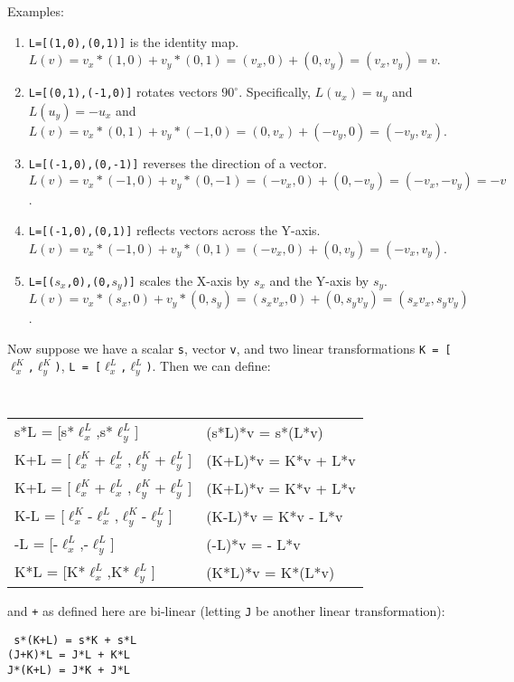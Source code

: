 \documentclass[12pt]{article}
\begin{document}
Examples:
\begin{enumerate}
\item {\tt L=[(1,0),(0,1)]} is the identity map.
$L(v)=v_x*(1,0) + v_y*(0,1) = (v_x,0)+(0,v_y) = (v_x,v_y) = v$.
\item {\tt L=[(0,1),(-1,0)]} rotates vectors $90^\circ$.
Specifically, $L(u_x)=u_y$ and $L(u_y)=-u_x$ and
$L(v)=v_x*(0,1) + v_y*(-1,0) = (0,v_x)+(-v_y,0) = (-v_y,v_x)$.
\item {\tt L=[(-1,0),(0,-1)]} reverses the direction of a vector.
$L(v)=v_x*(-1,0) + v_y*(0,-1) = (-v_x,0)+(0,-v_y) = (-v_x,-v_y) = -v$.
\item {\tt L=[(-1,0),(0,1)]} reflects vectors across the Y-axis.
$L(v)=v_x*(-1,0) + v_y*(0,1) = (-v_x,0)+(0,v_y) = (-v_x,v_y)$.
\item {\tt L=[($s_x$,0),(0,$s_y$)]} scales the X-axis by $s_x$ and
the Y-axis by $s_y$. \\
$L(v)=v_x*(s_x,0) + v_y*(0,s_y)
     = (s_x v_x,0)+(0,s_y v_y)= (s_x v_x, s_y v_y)$.
\end{enumerate}

Now suppose we have a scalar {\tt s}, vector {\tt v},
and two linear transformations
{\tt K = [$\ell^K_x$,$\ell^K_y$)},
{\tt L = [$\ell^L_x$,$\ell^L_y$)}.  Then we can define:
\begin{center}
\tt
\begin{tabular}{l@{~so that~}l}
s*L = [s*$\ell^L_x$,s*$\ell^L_y$]
	 & (s*L)*v = s*(L*v) \\[0.3ex]
K+L = [$\ell^K_x$+$\ell^L_x$,$\ell^K_y$+$\ell^L_y$]
	 & (K+L)*v = K*v + L*v \\[0.3ex]
K+L = [$\ell^K_x$+$\ell^L_x$,$\ell^K_y$+$\ell^L_y$]
	 & (K+L)*v = K*v + L*v \\[0.3ex]
K-L = [$\ell^K_x$-$\ell^L_x$,$\ell^K_y$-$\ell^L_y$]
	 & (K-L)*v = K*v - L*v \\[0.3ex]
-L = [-$\ell^L_x$,-$\ell^L_y$]
	 & (-L)*v = - L*v \\[0.3ex]
K*L = [K*$\ell^L_x$,K*$\ell^L_y$]
	 & (K*L)*v = K*(L*v)
\end{tabular}
\end{center}

{\tt *} and {\tt +} as defined here are bi-linear
(letting {\tt J} be another linear transformation):
\begin{center}
\tt
s*(K+L) = s*K + s*L \\
(J+K)*L = J*L + K*L \\
J*(K+L) = J*K + J*L
\end{center}
\end{document}
